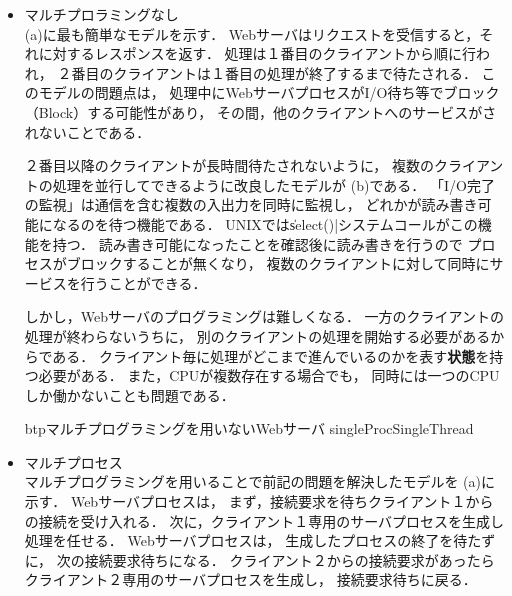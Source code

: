 \begin{itemize}
\item マルチプロラミングなし \\
(a)に最も簡単なモデルを示す．
Webサーバはリクエストを受信すると，それに対するレスポンスを返す．
処理は１番目のクライアントから順に行われ，
２番目のクライアントは１番目の処理が終了するまで待たされる．
このモデルの問題点は，
処理中にWebサーバプロセスがI/O待ち等でブロック（Block）する可能性があり，
その間，他のクライアントへのサービスがされないことである．

２番目以降のクライアントが長時間待たされないように，
複数のクライアントの処理を並行してできるように改良したモデルが
(b)である．
「I/O完了の監視」は通信を含む複数の入出力を同時に監視し，
どれかが読み書き可能になるのを待つ機能である．
UNIXでは\|select()|システムコールがこの機能を持つ．
読み書き可能になったことを確認後に読み書きを行うので
プロセスがブロックすることが無くなり，
複数のクライアントに対して同時にサービスを行うことができる．

しかし，Webサーバのプログラミングは難しくなる．
一方のクライアントの処理が終わらないうちに，
別のクライアントの処理を開始する必要があるからである．
クライアント毎に処理がどこまで進んでいるのかを表す{\bf 状態}を持つ必要がある．
また，CPUが複数存在する場合でも，
同時には一つのCPUしか働かないことも問題である．

\begin{myfig}{btp}{マルチプログラミングを用いないWebサーバ}
{singleProcSingleThread}
\begin{center}

\vspace{0.8cm}

\end{center}
\end{myfig}

\item マルチプロセス \\
マルチプログラミングを用いることで前記の問題を解決したモデルを
(a)に示す．
Webサーバプロセスは，
まず，接続要求を待ちクライアント１からの接続を受け入れる．
次に，クライアント１専用のサーバプロセスを生成し処理を任せる．
Webサーバプロセスは，
生成したプロセスの終了を待たずに，
次の接続要求待ちになる．
クライアント２からの接続要求があったら
クライアント２専用のサーバプロセスを生成し，
接続要求待ちに戻る．


\end{itemize}
